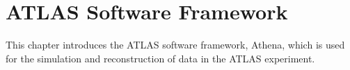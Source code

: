 \chapter{ATLAS Software Framework} \label{ch:Athena}
This chapter introduces the ATLAS software framework, Athena, which is used for the simulation and reconstruction of data in the ATLAS experiment.